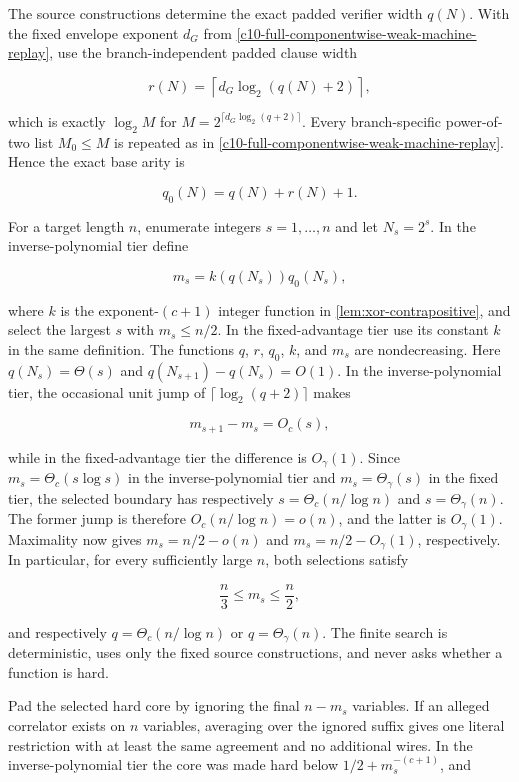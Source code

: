 \documentclass[11pt,letterpaper]{article}
\newcommand{\cref}[1]{\ref{#1}}
\theoremstyle{definition}
\theoremstyle{remark}
\begin{document}
The source constructions determine the exact padded verifier width
\(q(N)\). With the fixed envelope exponent \(d_G\) from \cref{c10-full-componentwise-weak-machine-replay},
use the branch-independent padded clause width

\[
r(N)
{}={}
\left\lceil d_G\log_2(q(N)+2)\right\rceil,
\]

which is exactly \(\log_2M\) for \(M=2^{\lceil d_G\log_2(q+2)\rceil}\).
Every branch-specific power-of-two list \(M_0\le M\) is repeated as in
\cref{c10-full-componentwise-weak-machine-replay}. Hence the exact base arity is

\[
q_0(N)=q(N)+r(N)+1.
\]

For a target length \(n\), enumerate integers \(s=1,\ldots,n\) and let
\(N_s=2^s\). In the inverse-polynomial tier define

\[
m_s
{}={}
k(q(N_s))q_0(N_s),
\]

where \(k\) is the exponent-\((c+1)\) integer function in \cref{lem:xor-contrapositive},
and select the largest \(s\) with \(m_s\le n/2\). In the fixed-advantage
tier use its constant \(k\) in the same definition. The functions \(q\),
\(r\), \(q_0\), \(k\), and \(m_s\) are nondecreasing. Here
\(q(N_s)=\Theta(s)\) and \(q(N_{s+1})-q(N_s)=O(1)\). In the
inverse-polynomial tier, the occasional unit jump of
\(\lceil\log_2(q+2)\rceil\) makes

\[
m_{s+1}-m_s=O_c(s),
\]

while in the fixed-advantage tier the difference is \(O_\gamma(1)\).
Since \(m_s=\Theta_c(s\log s)\) in the inverse-polynomial tier and
\(m_s=\Theta_\gamma(s)\) in the fixed tier, the selected boundary has
respectively \(s=\Theta_c(n/\log n)\) and \(s=\Theta_\gamma(n)\). The
former jump is therefore \(O_c(n/\log n)=o(n)\), and the latter is
\(O_\gamma(1)\). Maximality now gives \(m_s=n/2-o(n)\) and
\(m_s=n/2-O_\gamma(1)\), respectively. In particular, for every
sufficiently large \(n\), both selections satisfy

\[
\frac n3\le m_s\le\frac n2,
\]

and respectively \(q=\Theta_c(n/\log n)\) or \(q=\Theta_\gamma(n)\). The
finite search is deterministic, uses only the fixed source
constructions, and never asks whether a function is hard.

Pad the selected hard core by ignoring the final \(n-m_s\) variables. If
an alleged correlator exists on \(n\) variables, averaging over the
ignored suffix gives one literal restriction with at least the same
agreement and no additional wires. In the inverse-polynomial tier the
core was made hard below \(1/2+m_s^{-(c+1)}\), and
\end{document}
